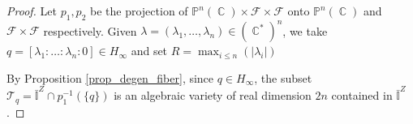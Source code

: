 \documentclass[12pt]{amsbook}%
\theoremstyle{definition}
\theoremstyle{remark}
\numberwithin{section}{chapter}
\numberwithin{subsection}{section}
\numberwithin{figure}{chapter}
\DeclareMathOperator{\C}{\mathbb{C}}
\def\bP{{\mathbb{P}}}
\def\cF{{\mathscr{F}}}
\begin{document}
{{\begin{proof}
Let $p_1, p_2$ be the projection of $\bP^n(\C) \times \cF \times \cF$ onto $\bP^n(\C)$ and $\cF \times \cF$ respectively. 
Given $\lambda= (\lambda_1, \ldots, \lambda_n)  \in (\C^*)^n$, we take $q = [\lambda_1 : \ldots : \lambda_n :0] \in H_\infty$ and set $R = \max_{i\leqslant n}(|\lambda_i|)$
 

By Proposition \ref{prop_degen_fiber}, since $q\in H_\infty$, the subset $\mathcal{T}_q =\bar{\mathbb{I}}^Z \cap p_1^{-1}(\{q \})$ is an algebraic variety of real dimension $2n$ contained in $\bar{\mathbb{I}}^Z$. 


\end{proof}}}
\end{document}
